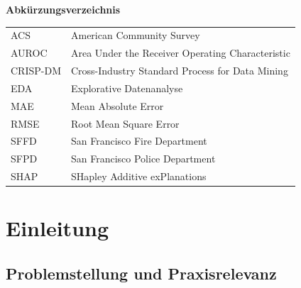 \documentclass[12pt,a4paper]{article}
\begin{document}

\newpage
\tableofcontents

\newpage
\listoffigures

\newpage
{}
{\bfseries\normalsize Abkürzungsverzeichnis}
\vspace{6pt}

\begin{tabular}{@{}ll}
ACS & American Community Survey \\[12pt]
AUROC & Area Under the Receiver Operating Characteristic \\[12pt]
CRISP-DM & Cross-Industry Standard Process for Data Mining \\[12pt]
EDA & Explorative Datenanalyse \\[12pt]
MAE & Mean Absolute Error \\[12pt]
RMSE & Root Mean Square Error \\[12pt]
SFFD & San Francisco Fire Department \\[12pt]
SFPD & San Francisco Police Department \\[12pt]
SHAP & SHapley Additive exPlanations \\[12pt]
\end{tabular}


\newpage
\listoftables

\newpage
{}
{}
\listofformeln

\newpage
{}
\setcounter{page}{1}

\section{Einleitung}
\subsection{Problemstellung und Praxisrelevanz}
\end{document}

